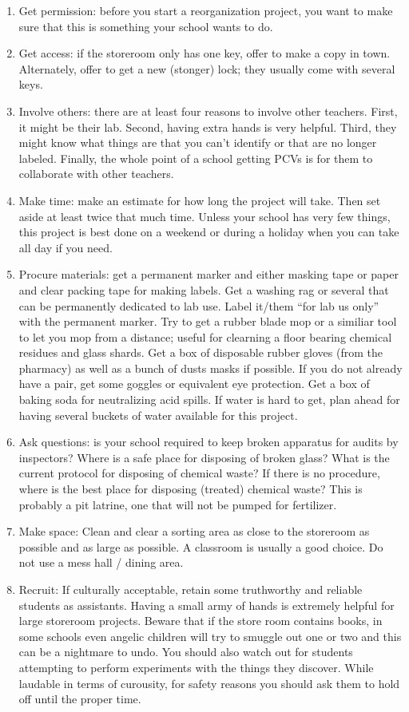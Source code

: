 \begin{enumerate}
\item{Get permission: before you start a reorganization project, you want to make sure that this is something your school wants to do.}
\item{Get access: if the storeroom only has one key, offer to make a copy in town. Alternately, offer to get a new (stonger) lock; they usually come with several keys.}
\item{Involve others: there are at least four reasons to involve other teachers. First, it might be their lab. Second, having extra hands is very helpful. Third, they might know what things are that you can't identify or that are no longer labeled. Finally, the whole point of a school getting PCVs is for them to collaborate with other teachers.}
\item{Make time: make an estimate for how long the project will take. Then set aside at least twice that much time. Unless your school has very few things, this project is best done on a weekend or during a holiday when you can take all day if you need.}
\item{Procure materials: get a permanent marker and either masking tape or paper and clear packing tape for making labels. Get a washing rag or several that can be permanently dedicated to lab use. Label it/them ``for lab us only'' with the permanent marker. Try to get a rubber blade mop or a similiar tool to let you mop from a distance; useful for clearning a floor bearing chemical residues and glass shards. Get a box of disposable rubber gloves (from the pharmacy) as well as a bunch of dusts masks if possible. If you do not already have a pair, get some goggles or equivalent eye protection. Get a box of baking soda for neutralizing acid spills. If water is hard to get, plan ahead for having several buckets of water available for this project.}
\item{Ask questions: is your school required to keep broken apparatus for audits by inspectors? Where is a safe place for disposing of broken glass? What is the current protocol for disposing of chemical waste? If there is no procedure, where is the best place for disposing (treated) chemical waste? This is probably a pit latrine, one that will not be pumped for fertilizer.}
\item{Make space: Clean and clear a sorting area as close to the storeroom as possible and as large as possible. A classroom is usually a good choice. Do not use a mess hall / dining area.}
\item{Recruit: If culturally acceptable, retain some truthworthy and reliable students as assistants. Having a small army of hands is extremely helpful for large storeroom projects. Beware that if the store room contains books, in some schools even angelic children will try to smuggle out one or two and this can be a nightmare to undo. You should also watch out for students attempting to perform experiments with the things they discover. While laudable in terms of curousity, for safety reasons you should ask them to hold off until the proper time.}

\end{enumerate}
